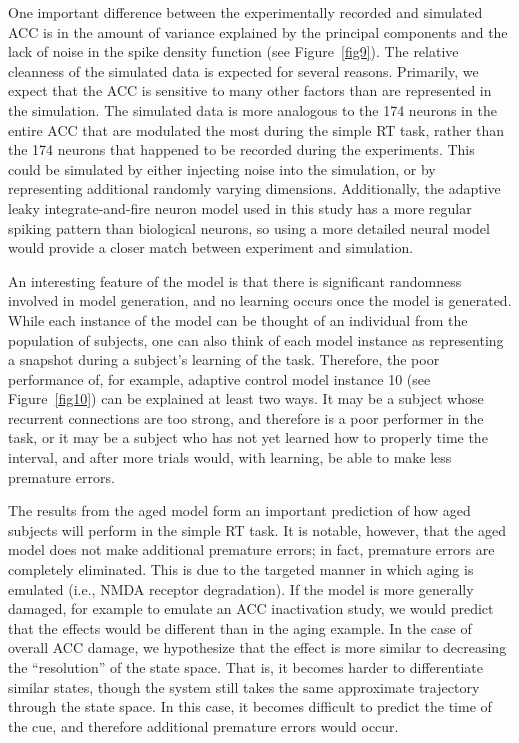 \documentclass[11pt]{article}
\begin{document}
One important difference between
the experimentally recorded and simulated ACC
is in the amount of variance
explained by the principal components
and the lack of noise in the
spike density function (see Figure~\ref{fig9}).
The relative cleanness of the simulated data
is expected for several reasons.
Primarily, we expect that the ACC
is sensitive to many other factors
than are represented in the simulation.
The simulated data is more analogous
to the 174 neurons in the entire ACC
that are modulated the most during the simple RT task,
rather than the 174 neurons that happened
to be recorded during the experiments.
This could be simulated
by either injecting
noise into the simulation,
or by representing additional
randomly varying dimensions.
Additionally, the adaptive
leaky integrate-and-fire neuron model used in this study
has a more regular spiking pattern than
biological neurons,
so using a more detailed neural model
would provide a closer match
between experiment and simulation.

An interesting feature of the model
is that there is significant randomness
involved in model generation,
and no learning occurs once the model is generated.
While each instance of the model
can be thought of an individual
from the population of subjects,
one can also think of each model instance as representing
a snapshot during a subject's
learning of the task.
Therefore, the poor performance of, for example,
adaptive control model instance 10 (see Figure~\ref{fig10})
can be explained at least two ways.
It may be a subject
whose recurrent connections are too strong,
and therefore is a poor performer in the task,
or it may be a subject
who has not yet learned how to properly time
the interval, and after more trials would,
with learning, be able to make less premature errors.

The results from the aged model
form an important prediction of
how aged subjects will perform in the simple RT task.
It is notable, however, that the aged model
does not make additional premature errors;
in fact, premature errors are completely eliminated.
This is due to the targeted manner in which
aging is emulated (i.e., NMDA receptor degradation).
If the model is more generally damaged,
for example to emulate an ACC inactivation study,
we would predict that the effects
would be different than in the aging example.
In the case of overall ACC damage,
we hypothesize that the effect is more similar
to decreasing the ``resolution'' of the state space.
That is, it becomes harder to differentiate
similar states, though the system
still takes the same approximate trajectory
through the state space.
In this case, it becomes difficult
to predict the time of the cue,
and therefore additional premature errors would occur.
\end{document}
